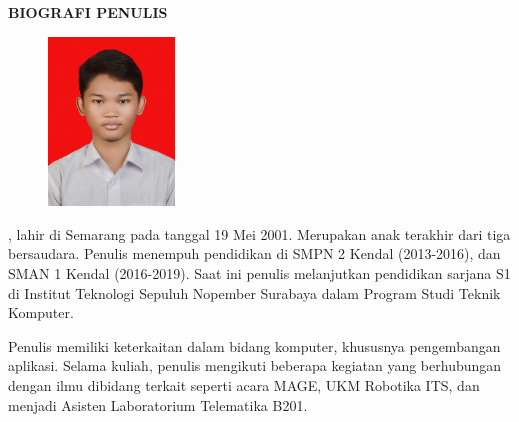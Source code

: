 \begin{center}
  \Large
  \textbf{BIOGRAFI PENULIS}
\end{center}


\vspace{2ex}

\begin{figure}
  \centering
  \vspace{-3ex}
  \includegraphics[width=0.3\textwidth]{gambar/foto-biodata.jpg}
  \vspace{-4ex}
\end{figure}

\name{}, lahir di Semarang pada tanggal 19 Mei 2001. Merupakan anak terakhir dari tiga bersaudara. Penulis menempuh pendidikan di SMPN 2 Kendal (2013-2016), dan SMAN 1 Kendal (2016-2019). Saat ini penulis melanjutkan pendidikan sarjana S1 di Institut Teknologi Sepuluh Nopember Surabaya dalam Program Studi Teknik Komputer. 

Penulis memiliki keterkaitan dalam bidang komputer, khususnya pengembangan aplikasi. Selama kuliah, penulis mengikuti beberapa kegiatan yang berhubungan dengan ilmu dibidang terkait seperti acara MAGE, UKM Robotika ITS, dan menjadi Asisten Laboratorium Telematika B201.

